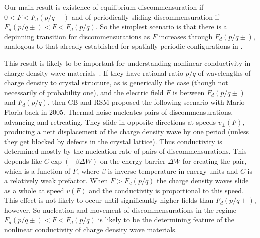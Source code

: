 \documentclass[12pt]{article}
\begin{document}
Our main result is existence of equilibrium discommensuration if $0< F < F_d(p/q\pm)$ and of periodically sliding discommensuration if $F_d(p/q\pm) < F < F_d(p/q)$.  So the simplest scenario is that there is a depinning transition for discommensurations as $F$ increases through $F_d(p/q\pm)$, analogous to that already established for spatially periodic configurations in \cite{BM}.

This result is likely to be important for understanding nonlinear conductivity in charge density wave materials~\cite{Gr,Th}.  If they have rational ratio $p/q$ of wavelengths of charge density to crystal structure, as is generically the case (though not necessarily of probability one), and the electric field $F$ is between $F_d(p/q\pm)$ and $F_d(p/q)$, then CB and RSM proposed the following scenario with Mario Floria back in 2005.  Thermal noise nucleates pairs of discommensurations, advancing and retreating.  They slide in opposite directions at speeds $v_\pm(F)$, producing a nett displacement of the charge density wave by one period (unless they get blocked by defects in the crystal lattice).  Thus conductivity is determined mostly by the nucleation rate of pairs of discommensurations.  This depends like $C\exp(-\beta\Delta W)$ on the energy barrier $\Delta W$ for creating the pair, which is a function of $F$, where $\beta$ is inverse temperature in energy units and $C$ is a relatively weak prefactor.
When $F>F_d(p/q)$ the charge density waves slide as a whole at speed $v(F)$ and the conductivity is proportional to this speed.  This effect is not likely to occur until significantly higher fields than $F_d(p/q\pm)$, however. So nucleation and movement of discommensurations in the regime $F_d(p/q\pm) < F < F_d(p/q)$ is likely to be the determining feature of the nonlinear conductivity of charge density wave materials.
\end{document}
